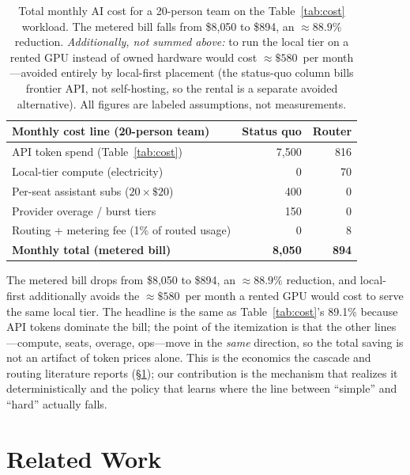 \documentclass[11pt]{article}
\begin{document}
\begin{table}[t]
\centering
\footnotesize
\setlength{\tabcolsep}{4pt}
\begin{tabular}{@{}lrr@{}}
\toprule
Monthly cost line (20-person team) & Status quo & Router \\
\midrule
API token spend (Table~\ref{tab:cost})        & 7{,}500 & 816 \\
Local-tier compute (electricity)               & 0       & 70  \\
Per-seat assistant subs ($20\times\$20$)       & 400     & 0   \\
Provider overage / burst tiers                 & 150     & 0   \\
Routing + metering fee (1\% of routed usage)   & 0       & 8   \\
\midrule
\textbf{Monthly total (metered bill)}          & \textbf{8{,}050} & \textbf{894} \\
\bottomrule
\end{tabular}
\caption{Total monthly AI cost for a 20-person team on the
Table~\ref{tab:cost} workload. The metered bill falls from \$8{,}050 to \$894,
an $\approx 88.9\%$ reduction. \emph{Additionally, not summed above:} to run the
local tier on a rented GPU instead of owned hardware would cost
$\approx\$580$~per month---avoided entirely by local-first placement (the status-quo
column bills frontier API, not self-hosting, so the rental is a separate avoided
alternative). All figures are labeled assumptions, not measurements.}
\label{tab:tco}
\end{table}

The metered bill drops from \$8{,}050 to \$894, an $\approx 88.9\%$ reduction,
and local-first additionally avoids the $\approx\$580$~per month a rented GPU would
cost to serve the same local tier. The headline is the same as
Table~\ref{tab:cost}'s 89.1\% because API tokens dominate the bill; the point of
the itemization is that the other lines---compute, seats, overage, ops---move in
the \emph{same} direction, so the total saving is not an artifact of token prices
alone. This is the economics the cascade and routing literature reports
(\S\ref{sec:related}); our contribution is the mechanism that realizes it
deterministically and the policy that learns where the line between ``simple''
and ``hard'' actually falls.

\section{Related Work}
\label{sec:related}
\end{document}
